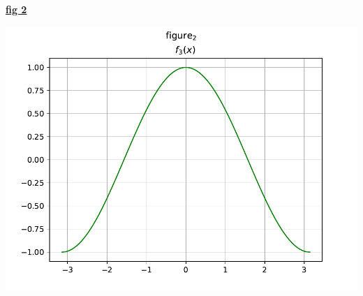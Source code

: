 \textbf{\underline{fig 2}}\\[0.1cm]
\begin{center}
    \includegraphics[height=0.35\textheight]{Chapters/Code/PLT/fig2.pdf}
\end{center}


